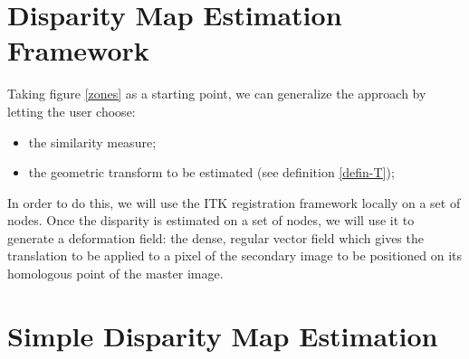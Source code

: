 


\section{Disparity Map Estimation Framework}
\label{sec:DisparityMapEstimationFramework}
Taking figure \ref{zones} as a starting point, we can generalize the
approach by letting the user choose:
\begin{itemize}
  \item the similarity measure;
  \item the geometric transform to be estimated (see definition
  \ref{defin-T});
\end{itemize}

In order to do this, we will use the ITK registration framework
locally on a set of nodes. Once the disparity is estimated on a set of
nodes, we will use it to generate a deformation field: the dense,
regular vector field which gives the translation to be applied to
a pixel of the secondary image to be positioned on its homologous
point of the master image.

\section{Simple Disparity Map Estimation}
\label{sec:SimpleDisparityMapEstimation}






